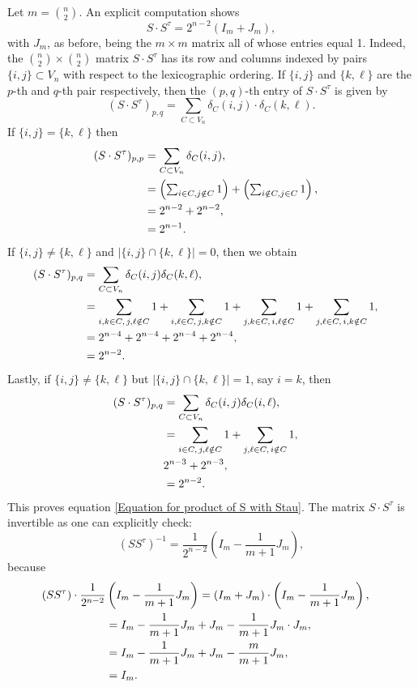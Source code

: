 \documentclass[12pt]{amsart}
\numberwithin{theorem}{section}
\theoremstyle{remark}
\begin{document}
Let $m = {n\choose 2}$. An explicit computation shows
\begin{equation} \label{Equation for product of S with Stau}
S\cdot S^\tau = 2^{n-2}(I_m +J_m), 
\end{equation}
with $J_m$, as before, being the $m\times m$ matrix all of whose entries equal 1. Indeed, the ${n\choose 2}\times {n\choose 2}$ matrix $S\cdot S^\tau$ has its row and columns indexed by pairs $\{i,j\}\subset V_n$ with respect to the lexicographic ordering. If $\{i,j\}$ and $\{k,\ell\}$ are the $p$-th and $q$-th pair respectively, then the $(p,q)$-th entry of $S\cdot S^\tau$ is given by 
$$(S\cdot S^\tau)_{p,q} = \sum _{C\subset V_n} \delta_C(i,j)\cdot \delta_C(k,\ell). $$
If $\{i,j\} = \{k,\ell\}$ then
\begin{align*}
(S\cdot S^\tau)_{p,p} & = \sum _{C\subset V_n} \delta_C(i,j),\cr
&\textstyle  = \left(\sum_{i\in C, j\notin C} 1\right) + \left(\sum_{i\notin C, j\in C} 1\right), \cr
& = 2^{n-2} + 2^{n-2},\cr
&  = 2^{n-1}. 
\end{align*}
If $\{i,j\} \ne \{k,\ell\}$ and $|\{i,j\}\cap \{k,\ell\}| = 0$, then we obtain 
\begin{align*}
(S\cdot S^\tau)_{p,q} & = \sum _{C\subset V_n} \delta_C(i,j) \delta_C(k,\ell),\cr 
& = \sum _{i,k\in C, \,  j,\ell\notin C} 1 + \sum _{i,\ell\in C, \,  j,k\notin C} 1 + \sum _{j,k\in C, \,  i,\ell\notin C} 1 + \sum _{j,\ell\in C, \,  i,k\notin C} 1, \cr 
& = 2^{n-4} + 2^{n-4} + 2^{n-4} + 2^{n-4}, \cr 
& = 2^{n-2}.
\end{align*}
Lastly, if $\{i,j\} \ne \{k,\ell\}$ but $|\{i,j\}\cap \{k,\ell\}| = 1$, say $i=k$, then  
\begin{align*}
(S\cdot S^\tau)_{p,q} & = \sum _{C\subset V_n} \delta_C(i,j) \delta_C(i,\ell), \cr 
& = \sum _{i\in C, \,  j,\ell\notin C} 1 + \sum _{j,\ell\in C, \,  i\notin C} 1, \cr 
& 2^{n-3} + 2^{n-3}, \cr 
& = 2^{n-2}.
\end{align*}
This proves equation \eqref{Equation for product of S with Stau}. The matrix $S\cdot S^\tau$ is invertible as one can explicitly check:  
$$ (SS^\tau) ^{-1} = \frac{1}{2^{n-2}} \left(I_m-\frac{1}{m+1}J_m\right),$$
because 
\begin{align*}
(SS^\tau) \cdot \frac{1}{2^{n-2}} & \left(I_m-\frac{1}{m+1}J_m \right)  = (I_m+J_m)\cdot \left(I_m-\frac{1}{m+1}J_m \right), \cr 
& = I_m    -\frac{1}{m+1}J_m  + J_m -\frac{1}{m+1} J_m \cdot J_m, \cr 
& = I_m    -\frac{1}{m+1}J_m  + J_m -\frac{m}{m+1} J_m, \cr 
& = I_m.
\end{align*}
\end{document}
